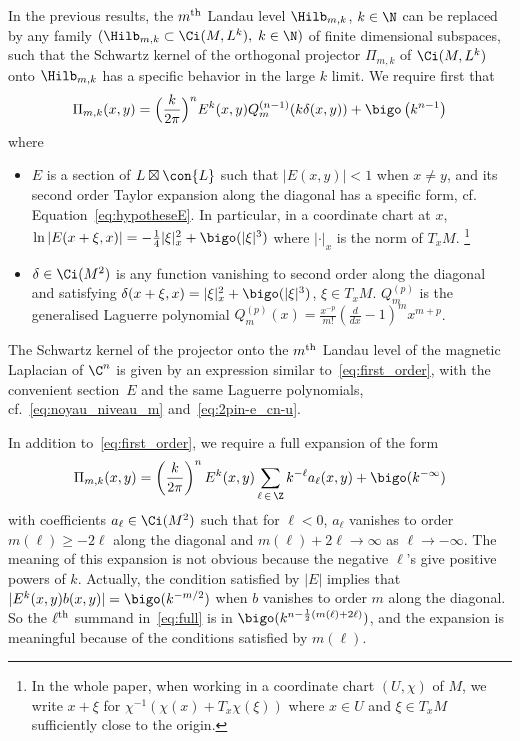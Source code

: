 In the previous results, the $m^{\rm th}$ Landau level $\Hilb_{m,k}$, $k\in \N$ can be replaced by any family $(\Hilb_{m,k} \subset \Ci (M, L^k), \; k \in \N) $ of finite dimensional subspaces, such that the Schwartz kernel of the orthogonal projector $\Pi_{m,k}$ of $\Ci (M, L^k)$ onto $\Hilb_{m,k}$ has a specific behavior in the large $k$ limit. We require first that
\begin{gather}\label{eq:first_order}
\Pi_{m,k} (x,y) = \Bigl(\frac{k}{ 2\pi} \Bigr)^n E^k (x,y) Q^{(n-1)}_m (k
\delta (x,y)) + \bigo \left(k^{n-1}\right)
\end{gather}
where
\begin{itemize}
\item[-] $E$ is a section of $L \boxtimes \con{L}$ such that $|E(x,y)| < 1$ when $x \neq y$, and its second order Taylor expansion along the diagonal has a specific form, cf. Equation~\eqref{eq:hypotheseE}.  In particular, in a coordinate chart at $x$, $\ln |E(x+
\xi, x)|= - \frac{1}{4} |\xi|_x^2 + \bigo (|\xi|^3)$ where $|\cdot |_x$ is the norm of $T_xM$.  \footnote{In the whole paper, when working in a coordinate chart $(U, \chi)$ of $M$, we write $x+ \xi$ for $ \chi^{-1} (
\chi (x) + T_x \chi (\xi))$ where $x \in U$ and $\xi \in T_xM$ sufficiently close to the origin.}
\item[-] $\delta \in \Ci (M^2)$ is any function vanishing to second order along the diagonal and satisfying $\delta (x+ \xi, x) = |\xi|_x^2 + \bigo (|\xi|^3)$, $\xi \in T_xM$. $Q_m^{(p)} $ is the generalised Laguerre polynomial $Q^{(p)}_m (x) = \frac{x^{-p}}{m!} (\frac{d}{dx} -1 ) ^m x ^{m+p}$.
\end{itemize}
The Schwartz kernel of the projector onto the $m^{\rm th}$ Landau level of the magnetic Laplacian of $\C^n$ is given by an expression similar to~\eqref{eq:first_order}, with the convenient section~$E$ and the same Laguerre polynomials, cf.~\eqref{eq:noyau_niveau_m} and~\eqref{eq:2pin-e_cn-u}. 

In addition to~\eqref{eq:first_order}, we require a full expansion of the form
\begin{gather}\label{eq:full}
\Pi_{m,k} (x,y) = \left(\frac{k}{ 2\pi} \right)^n E^k (x,y) \sum _{\ell\,\in\,\Z} k^{-\ell} a_{\ell} (x,y) + \bigo (k^{-\infty})
\end{gather}
with coefficients $a_{\ell} \in \Ci (M^2)$ such that for $\ell<0$, $a_{\ell}$ vanishes to order $m(\ell) \geqslant -2 \ell$ along the diagonal and $m(\ell) + 2\ell \rightarrow
\infty $ as $\ell \rightarrow - \infty$. The meaning of this expansion is not obvious because the negative $\ell$'s give positive powers of $k$. Actually, the condition satisfied by $|E|$ implies that $|E^k (x,y) b(x,y) | = \bigo (k^{-m/2})$ when $b$ vanishes to order $m$ along the diagonal. So the $\ell^{\rm th}$ summand in~\eqref{eq:full} is in $\bigo (k^{n - \frac{1}{2} (m (\ell) + 2\ell)})$, and the expansion is meaningful because of the conditions satisfied by $m (\ell)$.

